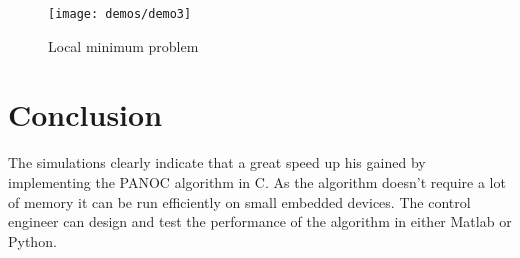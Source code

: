 \begin{figure}[H]
	\centering
	\texttt{[image: demos/demo3]}
	\caption{Local minimum problem}
	\label{fig:demo: local minimum problem}
\end{figure}

\section{Conclusion}

The simulations clearly indicate that a great speed up his gained by implementing the PANOC algorithm in C. As the algorithm doesn't require a lot of memory it can be run efficiently on small embedded devices. The control engineer can design and test the performance of the algorithm in either Matlab or Python.